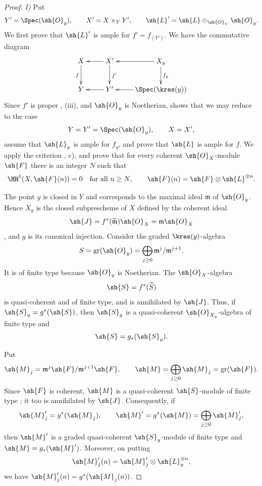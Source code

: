 \begin{proof}

\noindent\textit{I)} Put
\[
  Y'=\Spec(\sh{O}_y),\qquad
  X'=X\times_Y Y',\qquad
  \sh{L}'=\sh{L}\otimes_{\sh{O}_Y}\sh{O}_y.
\]
We first prove that $\sh{L}'$ is ample for $f'=f_{(Y')}$.  We have
the commutative diagram
\[
  \xymatrix{
    X\ar[d]_f
      &
    X'\ar[l]\ar[d]^{f'}
      &
    X_y\ar[l]\ar[d]^{f_y}
    \\
    Y
      &
    Y'\ar[l]
      &
    \Spec(\kres(y))\ar[l].
  }
\]
Since $f'$ is proper , (iii), and $\sh{O}_y$ is
Noetherian,  shows that we may reduce to the case
\[
  Y=Y'=\Spec(\sh{O}_y),\qquad X=X',
\]
assume that $\sh{L}_y$ is ample for $f_y$, and prove that $\sh{L}$
is ample for $f$.  We apply the criterion
, c), and prove that for every coherent
$\sh{O}_X$-module $\sh{F}$ there is an integer $N$ such that
\[
  \HH^1(X,\sh{F}(n))=0
  \quad\text{for all }n\geq N,
  \qquad
  \sh{F}(n)=\sh{F}\otimes\sh{L}^{\otimes n}.
\]

The point $y$ is closed in $Y$ and corresponds to the maximal ideal
$\mathfrak m$ of $\sh{O}_y$.  Hence $X_y$ is the closed
subprescheme of $X$ defined by the coherent ideal
\[
  \sh{J}
  =
  f^*(\widetilde{\mathfrak m})\sh{O}_X
  =
  \mathfrak m\sh{O}_X
\]
, and $g$ is its canonical injection.  Consider
the graded $\kres(y)$-algebra
\[
  S=\operatorname{gr}(\sh{O}_y)
   =\bigoplus_{j\geq0}
      \mathfrak m^j/\mathfrak m^{j+1}.
\]
It is of finite type because $\sh{O}_y$ is Noetherian.  The
$\sh{O}_X$-algebra
\[
  \sh{S}=f^*(\widetilde S)
\]
is quasi-coherent and of finite type, and is annihilated by
$\sh{J}$.  Thus, if $\sh{S}_y=g^*(\sh{S})$, then $\sh{S}_y$ is a
quasi-coherent $\sh{O}_{X_y}$-algebra of finite type and
\[
  \sh{S}=g_*(\sh{S}_y).
\]

Put
\[
  \sh{M}_j
  =
  \mathfrak m^j\sh{F}/\mathfrak m^{j+1}\sh{F},
  \qquad
  \sh{M}
  =
  \bigoplus_{j\geq0}\sh{M}_j
  =
  \operatorname{gr}(\sh{F}).
\]
Since $\sh{F}$ is coherent, $\sh{M}$ is a quasi-coherent
$\sh{S}$-module of finite type ; it too is
annihilated by $\sh{J}$.  Consequently, if
\[
  \sh{M}'_j=g^*(\sh{M}_j),
  \qquad
  \sh{M}'=g^*(\sh{M})
    =\bigoplus_{j\geq0}\sh{M}'_j,
\]
then $\sh{M}'$ is a graded quasi-coherent $\sh{S}_y$-module of
finite type and $\sh{M}=g_*(\sh{M}')$.  Moreover, on putting
\[
  \sh{M}'_j(n)
  =
  \sh{M}'_j\otimes\sh{L}_y^{\otimes n},
\]
we have $\sh{M}'_j(n)=g^*(\sh{M}_j(n))$.


\end{proof}
